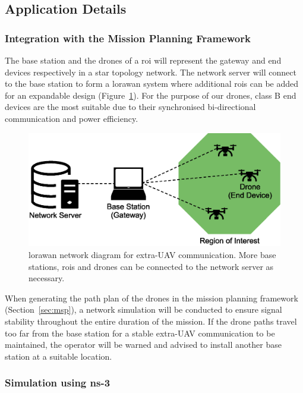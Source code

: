 \subsection{Application Details}
\label{sec:euc_application}

\subsubsection{Integration with the Mission Planning Framework}

The base station and the drones of a \gls{roi} will represent the gateway and end devices respectively in a star topology network. The network server will connect to the base station to form a \gls{lorawan} system where additional \gls{roi}s can be added for an expandable design (Figure~\ref{fig:euc_network_diagram}). For the purpose of our drones, class B end devices are the most suitable due to their synchronised bi-directional communication and power efficiency. 

\begin{figure}[h!]
    \centering
    \includegraphics[width=0.7\linewidth]{figs/Jihwan/Network Diagram of LoRa.eps}
    \caption[LoRaWAN Network Diagram for Extra-UAV Communication]
    {\gls{lorawan} network diagram for extra-\gls{UAV} communication. More base stations, \gls{roi}s and drones can be connected to the network server as necessary.}
    \label{fig:euc_network_diagram}
\end{figure}

When generating the path plan of the drones in the mission planning framework (Section~\ref{sec:msp}), a network simulation will be conducted to ensure signal stability throughout the entire duration of the mission. If the drone paths travel too far from the base station for a stable extra-\gls{UAV} communication to be maintained, the operator will be warned and advised to install another base station at a suitable location. 
 
\subsubsection{Simulation using ns-3}

